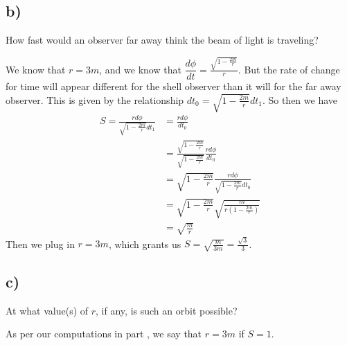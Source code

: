 \documentclass{article}
\theoremstyle{definition}
\begin{document}
    \subsection*{b)}
    \begin{mdframed}
        How fast would an observer far away think the beam of light is traveling?
    \end{mdframed}
    We know that $r = 3m$, and we know that $\dfrac{d\phi}{dt} = \frac{\sqrt{1 - \frac{2m}{r}}}{r}$.
    But the rate of change for time will appear different for the shell observer than it will for the far away 
    observer. This is given by the relationship $dt_0 = \sqrt{1-\frac{2m}{r}}dt_1$. So then we have 
    \begin{align*}
        S = \frac{rd\phi}{\sqrt{1-\frac{2m}{r}}dt_1}& = \frac{r d\phi}{dt_0}  \\
        &= \frac{\sqrt{1-\frac{2m}{r}}}{\sqrt{1-\frac{2m}{r}}}  \frac{r d\phi}{dt_0} \\
        &= \sqrt{1-\frac{2m}{r}} \frac{r d\phi}{\sqrt{1-\frac{2m}{r}}dt_0} \\
        &= \sqrt{1-\frac{2m}{r}}\sqrt{\frac{m}{r(1- \frac{2m}{r})}}\\
        &= \sqrt{\frac{m}{r}}
    \end{align*}
    Then we plug in $r = 3m$, which grants us $S = \sqrt{\frac{m}{3m}} = \frac{\sqrt{3}}{3}$.
    \subsection*{c)}
        \begin{mdframed}
            At what value(s) of $r$, if any, is such an orbit possible?
        \end{mdframed}
        As per our computations in part , we say that $r = 3m$ if $S = 1$.
\end{document}
